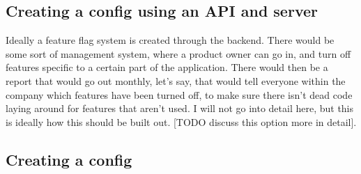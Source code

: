\subsection{ Creating a config using an API and server }
Ideally a feature flag system is created through the backend. There would be
some sort of management system, where a product owner can go in, and turn off
features specific to a certain part of the application. There would then be a
report that would go out monthly, let's say, that would tell everyone within the
company which features have been turned off, to make sure there isn't dead code
laying around for features that aren't used. I will not go into detail here, but
this is ideally how this should be built out. [TODO discuss this option more in
detail].

\subsection{ Creating a config }

